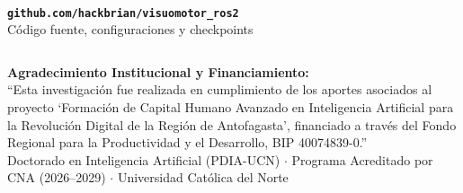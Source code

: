 \documentclass[aspectratio=169,10pt,xcolor={dvipsnames,table}]{beamer}
\newcommand{\CardArc}{2pt}                 %
\begin{document}
{\begin{frame}[plain]
\begin{columns}[T, onlytextwidth]
    \begin{column}{0.33\textwidth}
      \begin{tcolorbox}[
        enhanced,
        colback=white,
        colframe=InfonorOrange,
        arc=3pt,
        boxrule=1pt,
        title={\fontsize{7.5}{9}\selectfont\bfseries\color{white} Código Abierto},
        colbacktitle=InfonorBlue,
        top=1.5mm, bottom=1.5mm, left=1mm, right=1mm
      ]
        \centering
        \\[1.5mm]
        {\fontsize{5.2}{6.5}\selectfont\bfseries\textcolor{InfonorBlue}{\texttt{github.com/hackbrian/visuomotor\_ros2}}}\\[0.4mm]
        {\fontsize{4.8}{5.8}\selectfont\textcolor{TextDark!80}{Código fuente, configuraciones y checkpoints}}
      \end{tcolorbox}
    \end{column}
  \end{columns}
  \vspace{1.5mm}
  \begin{tcolorbox}[
    enhanced,
    colback=GoldGORELight,
    colframe=GoldGORE,
    boxrule=0.6pt,
    arc=\CardArc,
    top=0.8mm, bottom=0.8mm, left=2mm, right=2mm
  ]
    {\fontsize{5.2}{6.4}\selectfont\textcolor{TextDark}{%
    \textbf{Agradecimiento Institucional y Financiamiento:}\\
    ``Esta investigación fue realizada en cumplimiento de los aportes asociados al proyecto `Formación de Capital Humano Avanzado en Inteligencia Artificial para la Revolución Digital de la Región de Antofagasta', financiado a través del Fondo Regional para la Productividad y el Desarrollo, BIP 40074839-0.''}\\[0.4mm]
    {\fontsize{4.8}{5.8}\selectfont\textcolor{TextDark!80}{Doctorado en Inteligencia Artificial (PDIA-UCN) $\cdot$ Programa Acreditado por CNA (2026--2029) $\cdot$ Universidad Católica del Norte}}\par}
  \end{tcolorbox}
\end{frame}
}
\end{document}
